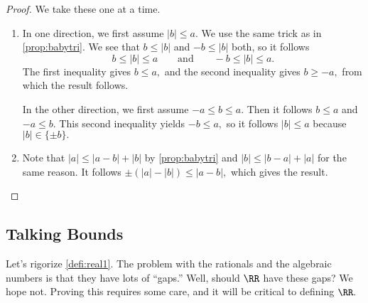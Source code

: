 \begin{proof}
    We take these one at a time.
    \begin{enumerate}[label=(\alph*)]
        \item In one direction, we first assume $|b|\le a.$ We use the same trick as in \autoref{prop:babytri}. We see that $b\le|b|$ and $-b\le|b|$ both, so it follows
        \[b\le|b|\le a\qquad\text{and}\qquad-b\le|b|\le a.\]
        The first inequality gives $b\le a,$ and the second inequality gives $b\ge-a,$ from which the result follows.
        
        In the other direction, we first assume $-a\le b\le a.$ Then it follows $b\le a$ and $-a\le b.$ This second inequality yields $-b\le a,$ so it follows $|b|\le a$ because $|b|\in\{\pm b\}.$
        \item Note that $|a|\le|a-b|+|b|$ by \autoref{prop:babytri} and $|b|\le|b-a|+|a|$ for the same reason. It follows $\pm(|a|-|b|)\le|a-b|,$ which gives the result.
        \qedhere
    \end{enumerate}
\end{proof}

\subsection{Talking Bounds}
Let's rigorize \autoref{defi:real1}. The problem with the rationals and the algebraic numbers is that they have lots of ``gaps.'' Well, should $\RR$ have these gaps? We hope not. Proving this requires some care, and it will be critical to defining $\RR.$

